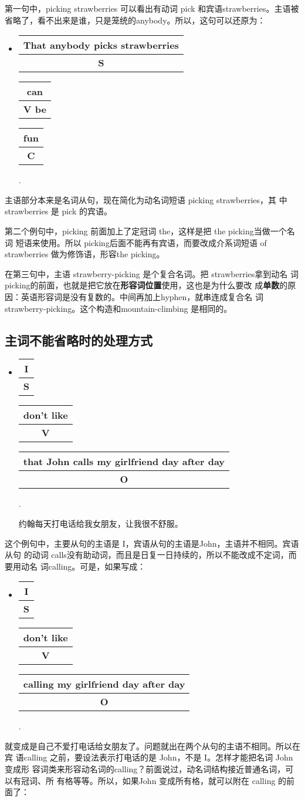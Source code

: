 \documentclass{yufa}
\makeatletter
\newcommand\unct[2]{\def\arraystretch{0.8}
  {\setlength{\tabcolsep}{0pt}
    \begin{tabular}[t]{@{}c@{}} \setlength\arrayrulewidth{0.8pt} \textbf{#1}\\\hline \textbf{\small #2} \\\end{tabular}}}
\makeatother
\begin{document}
第一句中，picking strawberries 可以看出有动词 pick 和宾语strawberries。主语被
省略了，看不出来是谁，只是笼统的anybody。所以，这句可以还原为：

\begin{itemize}
\item  \unct{That anybody picks strawberries}{S} \unct{can}{V be} \unct{fun}{C}.
\end{itemize}

主语部分本来是名词从句，现在简化为动名词短语 picking strawberries，其
中strawberries 是 pick 的宾语。

第二个例句中，picking 前面加上了定冠词 the，这样是把 the picking当做一个名词
短语来使用。所以 picking后面不能再有宾语，而要改成介系词短语 of strawberries
做为修饰语，形容the picking。

在第三句中，主语 strawberry-picking 是个复合名词。把 strawberries拿到动名
词 picking的前面，也就是把它放在\textbf{形容词位置}使用，这也是为什么要改
成\textbf{单数}的原因：英语形容词是没有复数的。中间再加上hyphen，就串连成复合名
词 strawberry-picking。这个构造和mountain-climbing 是相同的。

\subsection{主词不能省略时的处理方式}

\begin{itemize}
\item \unct{I}{S} \unct{don't like}{V} \unct{that John calls my girlfriend day
    after day}{O}.

约翰每天打电话给我女朋友，让我很不舒服。
\end{itemize}

这个例句中，主要从句的主语是 I，宾语从句的主语是John，主语并不相同。宾语从句
的动词 calls没有助动词，而且是日复一日持续的，所以不能改成不定词，而要用动名
词calling。可是，如果写成：

\begin{itemize}
\item \unct{I}{S} \unct{don't like}{V} \unct{calling my girlfriend day after
    day}{O}.
\end{itemize}

就变成是自己不爱打电话给女朋友了。问题就出在两个从句的主语不相同。所以在宾
语calling 之前，要设法表示打电话的是 John，不是 I。怎样才能把名词 John变成形
容词类来形容动名词的calling？前面说过，动名词结构接近普通名词，可以有冠词、所
有格等等。所以，如果John 变成所有格，就可以附在 calling 的前面了：
\end{document}
